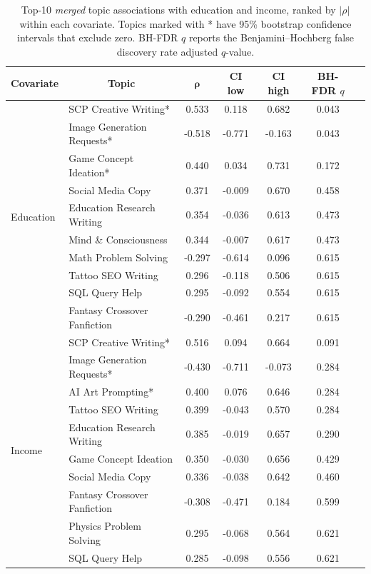 \documentclass[11pt]{article}
\begin{document}
\begin{table}[t]
\centering
\small
\setlength{\tabcolsep}{4pt}
\renewcommand{\arraystretch}{1.05}
\begin{tabular}{llccccc}
\toprule
\textbf{Covariate} & 
\multicolumn{1}{c}{\textbf{Topic}} & 
$\boldsymbol{\rho}$ & 
\textbf{CI low} & 
\textbf{CI high} & 
\textbf{BH-FDR $q$} \\
\midrule
\multirow{10}{*}{Education}
& SCP Creative Writing* & 0.533 & 0.118 & 0.682 & 0.043 \\
& Image Generation Requests* & -0.518 & -0.771 & -0.163 & 0.043 \\
& Game Concept Ideation* & 0.440 & 0.034 & 0.731 & 0.172 \\
& Social Media Copy & 0.371 & -0.009 & 0.670 & 0.458 \\
& Education Research Writing & 0.354 & -0.036 & 0.613 & 0.473 \\
& Mind \& Consciousness & 0.344 & -0.007 & 0.617 & 0.473 \\
& Math Problem Solving & -0.297 & -0.614 & 0.096 & 0.615 \\
& Tattoo SEO Writing & 0.296 & -0.118 & 0.506 & 0.615 \\
& SQL Query Help & 0.295 & -0.092 & 0.554 & 0.615 \\
& Fantasy Crossover Fanfiction & -0.290 & -0.461 & 0.217 & 0.615 \\
\midrule
\multirow{10}{*}{Income}
& SCP Creative Writing* & 0.516 & 0.094 & 0.664 & 0.091 \\
& Image Generation Requests* & -0.430 & -0.711 & -0.073 & 0.284 \\
& AI Art Prompting* & 0.400 & 0.076 & 0.646 & 0.284 \\
& Tattoo SEO Writing & 0.399 & -0.043 & 0.570 & 0.284 \\
& Education Research Writing & 0.385 & -0.019 & 0.657 & 0.290 \\
& Game Concept Ideation & 0.350 & -0.030 & 0.656 & 0.429 \\
& Social Media Copy & 0.336 & -0.038 & 0.642 & 0.460 \\
& Fantasy Crossover Fanfiction & -0.308 & -0.471 & 0.184 & 0.599 \\
& Physics Problem Solving & 0.295 & -0.068 & 0.564 & 0.621 \\
& SQL Query Help & 0.285 & -0.098 & 0.556 & 0.621 \\
\bottomrule
\end{tabular}
\caption{Top-10 \emph{merged} topic associations with education and income, ranked by $|\rho|$ within each covariate. Topics marked with * have 95\% bootstrap confidence intervals that exclude zero. BH-FDR $q$ reports the Benjamini--Hochberg false discovery rate adjusted $q$-value.}
\label{tab:rq2-correlations}
\end{table} 
\end{document}
